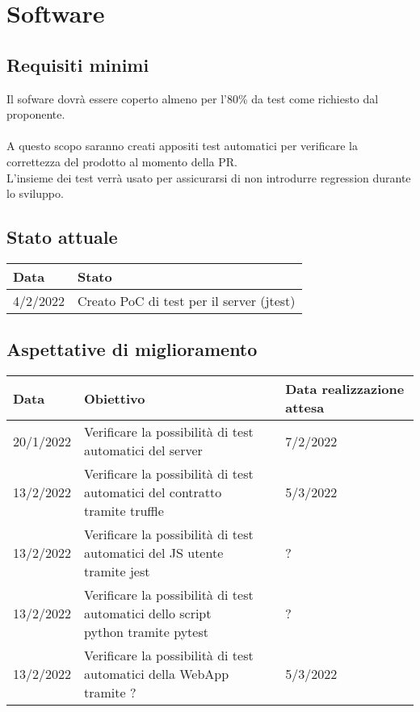 \documentclass[a4paper, 12pt]{article}
\begin{document}
\section{Software}
\subsection{Requisiti minimi}
Il sofware dovrà essere coperto almeno per l'80\% da test come richiesto dal proponente.\\\\
A questo scopo saranno creati appositi test automatici per verificare la correttezza del prodotto al momento della PR.\\
L'insieme dei test verrà usato per assicurarsi di non introdurre regression durante lo sviluppo.

\subsection{Stato attuale}
\begin{tabular}{|l|l|}\hline
	Data & Stato \\\hline
	4/2/2022 & Creato PoC di test per il server (jtest)\\\hline
\end{tabular}

\subsection{Aspettative di miglioramento}
\begin{tabular}{|l|l|l|}\hline
	Data & Obiettivo & Data realizzazione attesa \\\hline
	20/1/2022 & Verificare la possibilità di test automatici del server & 7/2/2022\\\hline
	13/2/2022 & \pbox{20cm}{Verificare la possibilità di test automatici del contratto\\ tramite truffle} & 5/3/2022\\\hline
	13/2/2022 & \pbox{20cm}{Verificare la possibilità di test automatici del JS utente \\tramite jest} & ?\\\hline
	13/2/2022 & \pbox{20cm}{Verificare la possibilità di test automatici dello script \\python tramite pytest} & ?\\\hline
	13/2/2022 & \pbox{20cm}{Verificare la possibilità di test automatici della WebApp \\tramite ?} & 5/3/2022\\\hline
\end{tabular}
\end{document}
